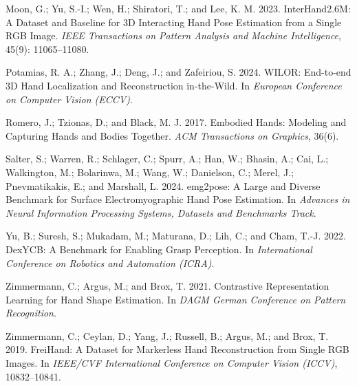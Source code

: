 Moon, G.; Yu, S.-I.; Wen, H.; Shiratori, T.; and Lee, K. M. 2023.
InterHand2.6M: A Dataset and Baseline for 3D Interacting Hand Pose Estimation
from a Single RGB Image. \emph{IEEE Transactions on Pattern Analysis and
Machine Intelligence}, 45(9): 11065--11080.

Potamias, R. A.; Zhang, J.; Deng, J.; and Zafeiriou, S. 2024. WILOR:
End-to-end 3D Hand Localization and Reconstruction in-the-Wild. In
\emph{European Conference on Computer Vision (ECCV)}.

Romero, J.; Tzionas, D.; and Black, M. J. 2017. Embodied Hands: Modeling and
Capturing Hands and Bodies Together. \emph{ACM Transactions on Graphics},
36(6).

Salter, S.; Warren, R.; Schlager, C.; Spurr, A.; Han, W.; Bhasin, A.; Cai,
L.; Walkington, M.; Bolarinwa, M.; Wang, W.; Danielson, C.; Merel, J.;
Pnevmatikakis, E.; and Marshall, L. 2024. emg2pose: A Large and Diverse
Benchmark for Surface Electromyographic Hand Pose Estimation. In
\emph{Advances in Neural Information Processing Systems, Datasets and
Benchmarks Track}.

Yu, B.; Suresh, S.; Mukadam, M.; Maturana, D.; Lih, C.; and Cham, T.-J.
2022. DexYCB: A Benchmark for Enabling Grasp Perception. In
\emph{International Conference on Robotics and Automation (ICRA)}.

Zimmermann, C.; Argus, M.; and Brox, T. 2021. Contrastive Representation
Learning for Hand Shape Estimation. In \emph{DAGM German Conference on
Pattern Recognition}.

Zimmermann, C.; Ceylan, D.; Yang, J.; Russell, B.; Argus, M.; and Brox, T.
2019. FreiHand: A Dataset for Markerless Hand Reconstruction from Single RGB
Images. In \emph{IEEE/CVF International Conference on Computer Vision
(ICCV)}, 10832--10841.

\endgroup
